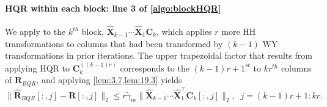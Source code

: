 \documentclass[review,onefignum,onetabnum]{siamart190516}
\newcommand{\bb}[1]{\mathbf{#1}}
\begin{document}
\paragraph{HQR within each block: line 3 of \cref{algo:blockHQR}}
We apply  to the $k^{th}$ block, $\hat{\bb{X}}_{k-1}\cdots\hat{\bb{X}}_1\bb{C}_k$, which applies $r$ more HH transformations to columns that had been transformed by $(k-1)$ WY transformations in prior iterations.
The upper trapezoidal factor that results from applying HQR to $\bb{C}_{k}^{((k-1)r)}$ corresponds to the $(k-1)r+1^{st}$ to $kr^{th}$ columns of $\hat{\bb{R}}_{BQR}$, and applying \cref{lem:3.7,lem:19.3} yields
\begin{equation*}
\|\hat{\bb{R}}_{BQR}[:,j]-\bb{R}[:,j]\|_2 \leq r\tilde{\gamma}_{m}\|\hat{\bb{X}}_{k-1}\cdots\hat{\bb{X}}_1^{\top}\bb{C}_k[:,j]\|_2,\;\; j=(k-1)r+1:kr.%
\end{equation*}
\end{document}
